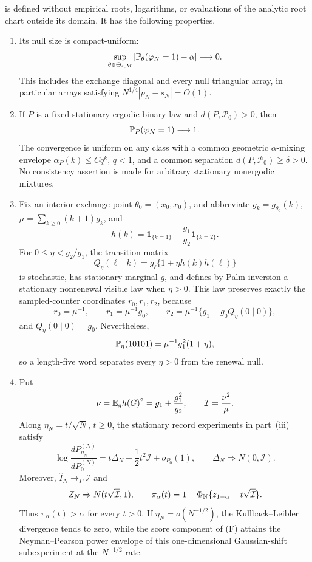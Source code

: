 \begin{paperthm}
is defined without empirical roots, logarithms, or evaluations of the analytic
root chart outside its domain.  It has the following properties.

\begin{enumerate}[label=\textup{(\roman*)}]
\item Its null size is compact-uniform:
\[
\sup_{\theta\in\Theta_{\varepsilon,M}}
\left|\mathbb{P}_\theta(\varphi_N=1)-\alpha\right|\longrightarrow0.
\]
This includes the exchange diagonal and every null triangular array, in
particular arrays satisfying $N^{1/4}|p_N-s_N|=O(1)$.

\item If $P$ is a fixed stationary ergodic binary law and
$d(P,\mathcal P_0)>0$, then
\[
\mathbb{P}_P(\varphi_N=1)\longrightarrow1.
\]
The convergence is uniform on any class with a common geometric
$\alpha$-mixing envelope $\alpha_P(k)\le Cq^k$, $q<1$, and a common
separation $d(P,\mathcal P_0)\ge\delta>0$.  No consistency assertion is made
for arbitrary stationary nonergodic mixtures.

\item Fix an interior exchange point $\theta_0=(x_0,x_0)$, and abbreviate
$g_k=g_{\theta_0}(k)$, $\mu=\sum_{k\ge0}(k+1)g_k$, and
\[
h(k)=\mathbf1_{\{k=1\}}-\frac{g_1}{g_2}\mathbf1_{\{k=2\}}.
\]
For $0\le\eta<g_2/g_1$, the transition matrix
\[
Q_\eta(\ell\mid k)=g_\ell\{1+\eta h(k)h(\ell)\}
\tag{G}
\]
is stochastic, has stationary marginal $g$, and defines by Palm inversion a
stationary nonrenewal visible law when $\eta>0$.  This law preserves exactly
the sampled-counter coordinates $r_0,r_1,r_2$, because
\[
r_0=\mu^{-1},\qquad r_1=\mu^{-1}g_0,
\qquad r_2=\mu^{-1}\{g_1+g_0Q_\eta(0\mid0)\},
\]
and $Q_\eta(0\mid0)=g_0$.  Nevertheless,
\[
\mathbb{P}_\eta(10101)=\mu^{-1}g_1^2(1+\eta),
\]
so a length-five word separates every $\eta>0$ from the renewal null.

\item Put
\[
\nu=\mathbb{E}_g h(G)^2=g_1+\frac{g_1^2}{g_2},
\qquad \mathcal I=\frac{\nu^2}{\mu}.
\]
Along $\eta_N=t/\sqrt N$, $t\ge0$, the stationary record experiments in
part~\textup{(iii)} satisfy
\[
\log\frac{dP_{\eta_N}^{(N)}}{dP_0^{(N)}}
=t\Delta_N-\frac12t^2\mathcal I+o_{P_0}(1),
\qquad \Delta_N\Rightarrow N(0,\mathcal I).
\]
Moreover, $\widehat I_N\to_P\mathcal I$ and
\[
Z_N\Rightarrow N(t\sqrt{\mathcal I},1),
\qquad
\pi_\alpha(t)=1-\Phi_{\rm N}
\{z_{1-\alpha}-t\sqrt{\mathcal I}\}.
\]
Thus $\pi_\alpha(t)>\alpha$ for every $t>0$.  If
$\eta_N=o(N^{-1/2})$, the Kullback--Leibler divergence tends to zero, while
the score component of \textup{(F)} attains the Neyman--Pearson power envelope
of this one-dimensional Gaussian-shift subexperiment at the $N^{-1/2}$
rate.
\end{enumerate}


\end{paperthm}
